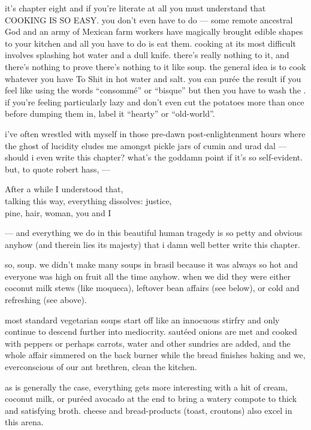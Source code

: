it's chapter eight and if you're literate at all you must understand
that COOKING IS SO EASY. you don't even have to do  --- some
remote ancestral God and an army of Mexican farm workers have
magically brought edible shapes to your kitchen and all you have to do
is eat them. cooking at its most difficult involves splashing hot
water and a dull knife. there's really nothing to it, and there's
nothing to prove there's nothing to it like soup. the general idea is
to cook whatever you have To Shit in hot water and salt. you can
pur\'{e}e the result if you feel like using the words ``consomm\'{e}''
or ``bisque'' but then you have to wash the . if you're feeling
particularly lazy and don't even cut the potatoes more than once
before dumping them in, label it ``hearty'' or ``old-world''.

i've often wrestled with myself in those pre-dawn post-enlightenment
hours where the ghost of lucidity eludes me amongst pickle jars of
cumin and urad dal --- should i even write this chapter? what's the
goddamn point if it's so self-evident. but, to quote robert hass, ---

\smallskip
\makebox[1cm]{}After a while I understood that,\\
\makebox[1cm]{}talking this way, everything dissolves: justice,\\
\makebox[1cm]{}pine, hair, woman, you and I
\smallskip

--- and everything we do in this beautiful human tragedy is so petty
and obvious anyhow (and therein lies its majesty) that i damn well
better write this chapter.

so, soup. we didn't make many soups in brasil because it was always so
hot and everyone was high on fruit all the time anyhow. when we did
they were either coconut milk stews (like moqueca), leftover bean
affairs (see below), or cold and refreshing (see above).

most standard vegetarian soups start off like an innocuous stirfry and
only continue to descend further into mediocrity. saut\'{e}ed onions
are met and cooked with peppers or perhaps carrots, water and other
sundries are added, and the whole affair simmered on the back burner
while the bread finishes baking and we, everconscious of our ant
brethren, clean the kitchen.

as is generally the case, everything gets more interesting with a hit
of cream, coconut milk, or pur\'{e}ed avocado at the end to bring a
watery compote to thick and satisfying broth. cheese and
bread-products (toast, croutons) also excel in this arena.

